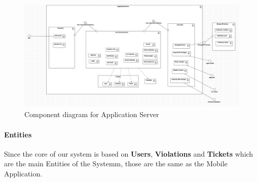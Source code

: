 \begin{figure}
\centering
\includegraphics[width=\textwidth]{Images/COMP-SERVER.png}
\caption{\label{fig:compdiag2} Component diagram for Application Server}
\end{figure}


\paragraph{Entities}
 Since the core of our system is based on \textbf{Users}, \textbf{Violations} and \textbf{Tickets} which are the main Entities of the Systemm, those are the same as the Mobile Application.

